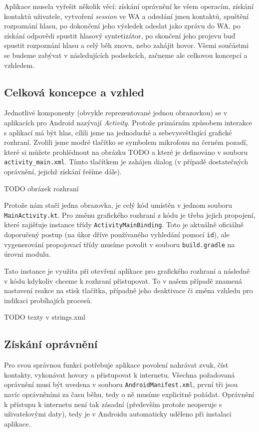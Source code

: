 Aplikace musela vyřešit několik věcí: získání oprávnění ke všem operacím,
získání kontaktů uživatele, vytvoření \textit{session} ve WA a odeslání
jmen kontaktů, spuštění rozpoznání hlasu, po dokončení jeho výsledek odeslat
jako zprávu do WA, po získání odpovědi spustit hlasový syntetizátor, po skončení
jeho projevu buď spustit rozpoznání hlasu a celý běh znovu, nebo zahájit
hovor. Všemi součástmi se budeme zabývat v následujících podsekcích, začneme
ale celkovou koncepcí a vzhledem.

\subsection{Celková koncepce a vzhled}

Jednotlivé komponenty (obvykle reprezentované jednou obrazovkou)
se v aplikacích
pro Android nazývají \textit{Activity}. Protože primárním způsobem interakce
s aplikací má být hlas, cílili jsme na jednoduché a sebevysvětlující grafické
rozhraní. Zvolili jsme modré tlačítko se symbolem mikrofonu na černém pozadí,
které si můžete prohlédnout na obrázku TODO a které je definováno v souboru
\texttt{activity\_main.xml}. Tímto tlačítkem je zahájen dialog (v případě
dostatečných oprávnění, jejichž získání řešíme dále).

TODO obrázek rozhraní

Protože nám stačí jedna obrazovka, je celý kód umístěn v jednom souboru
\texttt{MainActivity.kt}. Pro změnu grafického rozhraní z kódu je třeba
jejich propojení, které zajišťuje instance třídy \texttt{ActivityMainBinding}.
Toto je aktuálně oficiálně doporučený postup (na úkor dříve používaného
vyhledání pomocí \texttt{id}), ale vygenerování propojovací třídy musíme
povolit v souboru \texttt{build.gradle} na úrovni modulu.

Tato instance je využita při otevření aplikace pro  grafického
rozhraní a následně v kódu kdykoliv chceme k rozhraní přistupovat. To v našem
případě znamená nastavení reakce na stisk tlačítka, případně jeho deaktivace
či změna vzhledu pro indikaci probíhajích procesů.

TODO texty v strings.xml

\subsection{Získání oprávnění}

Pro svou správnou funkci potřebuje aplikace povolení nahrávat zvuk, číst
kontakty, vykonávat hovory a přistupovat k internetu. Všechna požadovaná
oprávnění musí být uvedena v souboru \texttt{AndroidManifest.xml}, první
tři jsou navíc oprávněními za času běhu, tedy o ně musíme explicitně
požádat. Oprávnění k přístupu k internetu není tak zásadní (především
protože neoperuje s uživatelovými daty), tedy je v Androidu automaticky
uděleno při instalaci aplikace.

